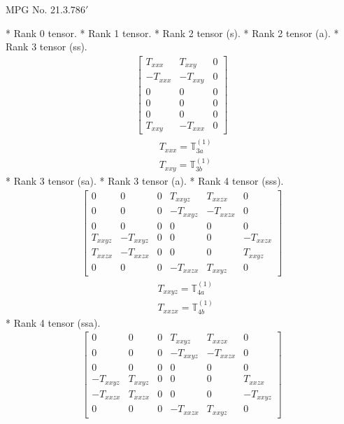 \documentclass[fleqn,8pt,landscape]{jsarticle}
\begin{document}
\setcounter{MaxMatrixCols}{32}

\renewcommand{\tablename}{Table~}
\renewcommand{\figurename}{Figure~}
\begin{center}
\LARGE
MPG No. 21.3.78\quad$6'$
\end{center}
* Rank 0 tensor.
* Rank 1 tensor.
* Rank 2 tensor (s).
* Rank 2 tensor (a).
* Rank 3 tensor (ss).
\begin{align*}
\begin{bmatrix} T_{xxx} & T_{xxy} & 0 \\ - T_{xxx} & - T_{xxy} & 0 \\ 0 & 0 & 0 \\ 0 & 0 & 0 \\ 0 & 0 & 0 \\ T_{xxy} & - T_{xxx} & 0 \end{bmatrix}
\end{align*}
\begin{align*}
& T_{xxx} = \mathbb{T}_{3a}^{(1)} \\
& T_{xxy} = \mathbb{T}_{3b}^{(1)}
\end{align*}
* Rank 3 tensor (sa).
* Rank 3 tensor (a).
* Rank 4 tensor (sss).
\begin{align*}
\begin{bmatrix} 0 & 0 & 0 & T_{xxyz} & T_{xxzx} & 0 \\ 0 & 0 & 0 & - T_{xxyz} & - T_{xxzx} & 0 \\ 0 & 0 & 0 & 0 & 0 & 0 \\ T_{xxyz} & - T_{xxyz} & 0 & 0 & 0 & - T_{xxzx} \\ T_{xxzx} & - T_{xxzx} & 0 & 0 & 0 & T_{xxyz} \\ 0 & 0 & 0 & - T_{xxzx} & T_{xxyz} & 0 \end{bmatrix}
\end{align*}
\begin{align*}
& T_{xxyz} = \mathbb{T}_{4a}^{(1)} \\
& T_{xxzx} = \mathbb{T}_{4b}^{(1)}
\end{align*}
* Rank 4 tensor (ssa).
\begin{align*}
\begin{bmatrix} 0 & 0 & 0 & T_{xxyz} & T_{xxzx} & 0 \\ 0 & 0 & 0 & - T_{xxyz} & - T_{xxzx} & 0 \\ 0 & 0 & 0 & 0 & 0 & 0 \\ - T_{xxyz} & T_{xxyz} & 0 & 0 & 0 & T_{xxzx} \\ - T_{xxzx} & T_{xxzx} & 0 & 0 & 0 & - T_{xxyz} \\ 0 & 0 & 0 & - T_{xxzx} & T_{xxyz} & 0 \end{bmatrix}
\end{align*}
\end{document}
